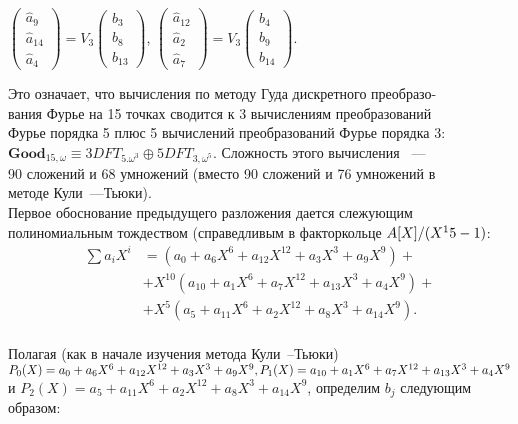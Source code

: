 \documentclass{mai_book}
\begin{document}
{\begin{center}
	$\begin{pmatrix}
	\hat{a}_9 \\ \hat{a}_{14} \\ \hat{a}_4 
	\end{pmatrix} = V_3
	\begin{pmatrix}
	b_3 \\ b_8 \\ b_{13} 
	\end{pmatrix}$,	
	$\begin{pmatrix}
	\hat{a}_{12} \\ \hat{a}_2 \\ \hat{a}_7 
	\end{pmatrix} = V_3
	\begin{pmatrix}
	b_4 \\ b_9 \\ b_{14} 
	\end{pmatrix}$.
\end{center}
\noindent Это означает, что вычисления по методу Гуда дискретного преобразо-\\вания Фурье на 15 точках сводится к 3 вычислениям преобразований\\ Фурье порядка 5 плюс 5 вычислений преобразований Фурье порядка $3$:\\
$\textbf{Good}_{15,\omega} \equiv 3 DFT_{5. \omega^3} \oplus 5 DFT_{3, \omega^5}$. Сложность этого вычисления ~--- \\ 90 сложений и 68 умножений (вместо 90 сложений и 76 умножений в \\ методе Кули~---Тьюки).\\
\indent Первое обоснование предыдущего разложения дается слежующим \\ полиномиальным тождеством (справедливым в факторкольце $A[X]/\\(X^15 - 1)$:\\
\begin{align*}
\sum a_iX^i &= (a_0 + a_6X^6 + a_{12}X^{12} + a_3X^3 + a_9X^9) + \\ &+ X^{10}(a_{10} + a_1X^6 + a_7X^{12} + a_{13}X^3 + a_4X^9) +\\ &+X^5(a_5 + a_{11}X^6 + a_2X^{12} + a_8X^3 + a_{14}X^9).
\end{align*} \\ 
Полагая (как в начале изучения метода Кули~--Тьюки) $P_0(X) = a_0 + \\ a_6X^6 + a_{12}X^{12}+ a_3X^3 + a_9X^9, P_1(X) = a_{10} + a_1X^6 + a_7X^{12}+ a_{13}X^3 + a_4X^9 $ \\ и $P_2(X) = a_5 + a_{11}X^6 + a_2X^{12}+ a_8X^3 + a_{14}X^9 $, определим $b_j$ следующим \\ образом: \\
}
\end{document}
